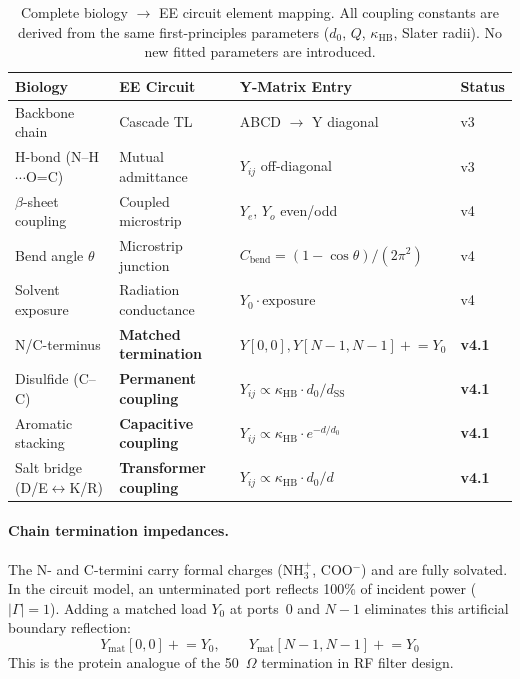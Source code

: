 \begin{table}[H]
\centering
\caption{Complete biology $\to$ EE circuit element mapping.
All coupling constants are derived from the same first-principles
parameters ($d_0$, $Q$, $\kappa_\text{HB}$, Slater radii).
No new fitted parameters are introduced.}
\label{tab:bio_circuit_map}
\small
\begin{tabular}{@{}l l l l@{}}
\toprule
\textbf{Biology} & \textbf{EE Circuit} & \textbf{Y-Matrix Entry} & \textbf{Status} \\
\midrule
Backbone chain & Cascade TL & ABCD $\to$ Y diagonal & v3 \\
H-bond (N--H$\cdots$O=C) & Mutual admittance & $Y_{ij}$ off-diagonal & v3 \\
$\beta$-sheet coupling & Coupled microstrip & $Y_e$, $Y_o$ even/odd & v4 \\
Bend angle $\theta$ & Microstrip junction & $C_\text{bend} = (1{-}\cos\theta)/(2\pi^2)$ & v4 \\
Solvent exposure & Radiation conductance & $Y_0 \cdot \text{exposure}$ & v4 \\
\midrule
N/C-terminus & \textbf{Matched termination} & $Y[0,0], Y[N{-}1,N{-}1] \mathrel{+}= Y_0$ & \textbf{v4.1} \\
Disulfide (C--C) & \textbf{Permanent coupling} & $Y_{ij} \propto \kappa_\text{HB} \cdot d_0/d_\text{SS}$ & \textbf{v4.1} \\
Aromatic stacking & \textbf{Capacitive coupling} & $Y_{ij} \propto \kappa_\text{HB} \cdot e^{-d/d_0}$ & \textbf{v4.1} \\
Salt bridge (D/E$\leftrightarrow$K/R) & \textbf{Transformer coupling} & $Y_{ij} \propto \kappa_\text{HB} \cdot d_0/d$ & \textbf{v4.1} \\
\bottomrule
\end{tabular}
\end{table}

\paragraph{Chain termination impedances.}
The N- and C-termini carry formal charges (NH$_3^+$, COO$^-$) and
are fully solvated.  In the circuit model, an unterminated port
reflects 100\% of incident power ($|\Gamma| = 1$).  Adding a matched
load $Y_0$ at ports~0 and $N{-}1$ eliminates this artificial boundary
reflection:
\begin{equation}
    Y_\text{mat}[0,0] \mathrel{+}= Y_0, \qquad
    Y_\text{mat}[N{-}1,N{-}1] \mathrel{+}= Y_0
    \label{eq:chain_term}
\end{equation}
This is the protein analogue of the 50~$\Omega$ termination in RF
filter design.

